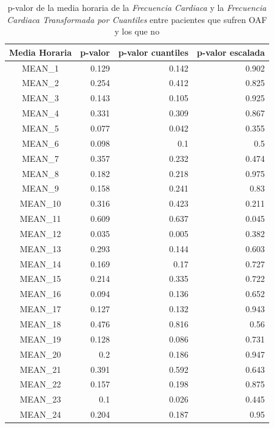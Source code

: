 \begin{table}[H]
    \centering
    \begin{tabular}{|c|r|r|r|}
        \hline
        \textbf{Media Horaria} & \textbf{p-valor} & \textbf{p-valor 
        cuantiles} & \textbf{p-valor 
        escalada} \\
        \hline
        MEAN\_1 & 0.129 & 0.142 & 0.902 \\
        MEAN\_2 & 0.254 & 0.412 & 0.825 \\
        MEAN\_3 & 0.143 & 0.105 & 0.925 \\
        MEAN\_4 & 0.331 & 0.309 & 0.867 \\
        MEAN\_5 & 0.077 & 0.042 & 0.355 \\
        MEAN\_6 & 0.098 & 0.1 & 0.5 \\
        MEAN\_7 & 0.357 & 0.232 & 0.474 \\
        MEAN\_8 & 0.182 & 0.218 & 0.975 \\
        MEAN\_9 & 0.158 & 0.241 & 0.83 \\
        MEAN\_10 & 0.316 & 0.423 & 0.211 \\
        MEAN\_11 & 0.609 & 0.637 & 0.045 \\
        MEAN\_12 & 0.035 & 0.005 & 0.382 \\
        MEAN\_13 & 0.293 & 0.144 & 0.603 \\
        MEAN\_14 & 0.169 & 0.17 & 0.727 \\
        MEAN\_15 & 0.214 & 0.335 & 0.722 \\
        MEAN\_16 & 0.094 & 0.136 & 0.652 \\
        MEAN\_17 & 0.127 & 0.132 & 0.943 \\
        MEAN\_18 & 0.476 & 0.816 & 0.56 \\
        MEAN\_19 & 0.128 & 0.086 & 0.731 \\
        MEAN\_20 & 0.2 & 0.186 & 0.947 \\
        MEAN\_21 & 0.391 & 0.592 & 0.643 \\
        MEAN\_22 & 0.157 & 0.198 & 0.875 \\
        MEAN\_23 & 0.1 & 0.026 & 0.445 \\
        MEAN\_24 & 0.204 & 0.187 & 0.95 \\
        \hline
    \end{tabular}
    \caption{p-valor de la media horaria de la \textit{Frecuencia Cardiaca} y la \textit{Frecuencia Cardiaca Transformada por Cuantiles} entre pacientes que sufren OAF y los que no}\label{tab:mean-FC}
\end{table}

